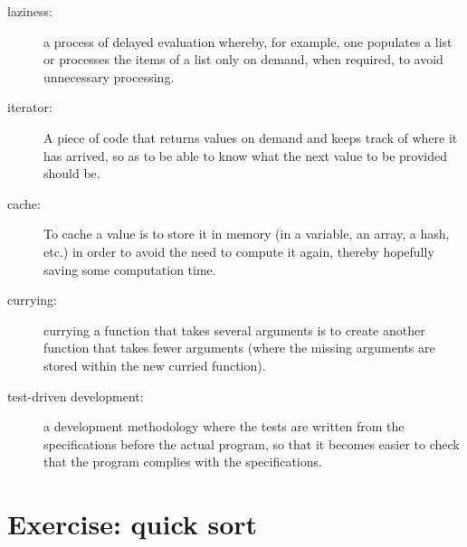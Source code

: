 \begin{description}
\item[laziness:] a process of delayed evaluation whereby, for 
example, one populates a list or processes the items of a list only 
on demand, when required, to avoid unnecessary processing.

\item[iterator:] A piece of code that returns values on demand 
and keeps track of where it has arrived, so as to be able 
to know what the next value to be provided should be.

\item[cache:] To cache a value is to store it in memory (in a 
variable, an array, a hash, etc.) in order to avoid the need to 
compute it again, thereby hopefully saving some computation time.

\item[currying:] currying a function that takes several 
arguments is to create another function that takes fewer 
arguments (where the missing arguments are stored within 
the new curried function).

\item[test-driven development:] a development methodology 
where the tests are written from the specifications before 
the actual program, so that it becomes easier to check that 
the program complies with the specifications.

\end{description}

\section{Exercise: quick sort}
\label{quicksort}

